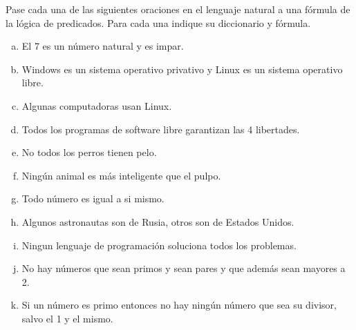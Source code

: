 \begin{exercise}
    Pase cada una de las siguientes oraciones en el lenguaje natural a una fórmula de la lógica de predicados. Para cada una indique su diccionario y fórmula.
    \begin{enumerate}[a)]
        \item El 7 es un número natural y es impar.
        \item Windows es un sistema operativo privativo y Linux es un sistema operativo libre.
        \item Algunas computadoras usan Linux.
        \item Todos los programas de software libre garantizan las 4 libertades.
        \item No todos los perros tienen pelo.
        \item Ningún animal es más inteligente que el pulpo.
        \item Todo número es igual a si mismo.
        \item Algunos astronautas son de Rusia, otros son de Estados Unidos.
        \item Ningun lenguaje de programación soluciona todos los problemas.
        \item No hay números que sean primos y sean pares y que además sean mayores a 2.
        \item Si un número es primo entonces no hay ningún número que sea su divisor, salvo el 1 y el mismo.
    \end{enumerate}
\end{exercise}

